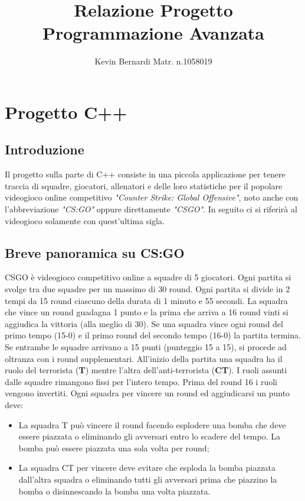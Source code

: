\documentclass[a4paper, 11pt]{article}
\title{Relazione Progetto Programmazione Avanzata}
\author{Kevin Bernardi Matr. n.1058019}
\date{}
\begin{document}
\maketitle
\section{Progetto C++}
\subsection{Introduzione}
Il progetto sulla parte di C++ consiste in una piccola applicazione per tenere traccia di squadre, giocatori, allenatori e delle loro statistiche per il popolare videogioco online competitivo \textit{"Counter Strike: Global Offensive"}, noto anche con l'abbreviazione \textit{"CS:GO"} oppure direttamente \textit{"CSGO"}.
In seguito ci si riferirà al videogioco solamente con quest'ultima sigla.

\subsection{Breve panoramica su CS:GO}
CSGO è videogioco competitivo online a squadre di 5 giocatori. Ogni partita si svolge tra due squadre per un massimo di 30 round. 
Ogni partita si divide in 2 tempi da 15 round ciascuno della durata di 1 minuto e 55 secondi.
La squadra che vince un round guadagna 1 punto e la prima che arriva a 16 round vinti si aggiudica la vittoria (alla meglio di 30). Se una squadra vince ogni round del primo tempo (15-0) e il primo round del secondo tempo (16-0) la partita termina. Se entrambe le squadre arrivano a 15 punti (punteggio 15 a 15), si procede ad oltranza con i round supplementari.
All'inizio della partita una squadra ha il ruolo del terrorista (\textbf{T}) mentre l'altra dell'anti-terrorista (\textbf{CT}). I ruoli assunti dalle squadre rimangono fissi per l'intero tempo. Prima del round 16 i ruoli vengono invertiti.
Ogni squadra per vincere un round ed aggiudicarsi un punto deve:
\begin{itemize}
\item La squadra T può vincere il round facendo esplodere una bomba che deve essere piazzata o eliminando gli avversari entro lo scadere del tempo. La bomba può essere piazzata una sola volta per round;

\item La squadra CT per vincere deve evitare che esploda la bomba piazzata dall'altra squadra o eliminando tutti gli avversari prima che piazzino la bomba o disinnescando la bomba una volta piazzata.
\end{itemize}
\end{document}
